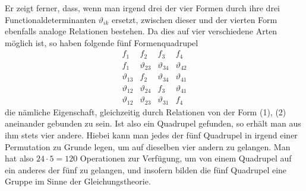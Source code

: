 Er zeigt ferner, dass, wenn man irgend drei der vier Formen durch ihre drei Functionaldeterminanten $\vartheta_{ik}$ ersetzt, zwischen dieser und der vierten Form ebenfalls analoge Relationen bestehen. Da dies auf vier verschiedene Arten möglich ist, so haben folgende fünf Formenquadrupel
\[
\begin{array}{cccc}
f_1 & f_2 & f_3 & f_4\\
f_1 & \vartheta_{23} & \vartheta_{34} & \vartheta_{42}\\
\vartheta_{13} & f_2 & \vartheta_{34} & \vartheta_{41}\\
\vartheta_{12} & \vartheta_{24} & f_3 & \vartheta_{41}\\
\vartheta_{12} & \vartheta_{23} & \vartheta_{31} & f_4
\end{array}
\]
die nämliche Eigenschaft, gleichzeitig durch Relationen von der Form (1), (2) aneinander gebunden zu sein. Ist also ein Quadrupel gefunden, so erhält man aus ihm stets vier andere. Hiebei kann man jedes der fünf Quadrupel in irgend einer Permutation zu Grunde legen, um auf dieselben vier andern zu gelangen. Man hat also $24\cdot5=120$ Operationen zur Verfügung, um von einem Quadrupel auf ein anderes der fünf zu gelangen, und insofern bilden die fünf Quadrupel eine Gruppe im Sinne der Gleichungstheorie.

